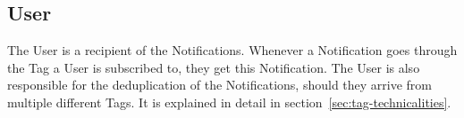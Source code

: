 \subsection{User}\label{sec:user}

The User is a recipient of the Notifications.
Whenever a Notification
goes through the Tag a User is subscribed to,
they get this Notification.
The User is also responsible for
the deduplication of the Notifications,
should they arrive from multiple different Tags.
It is explained in detail in section~\ref{sec:tag-technicalities}.
